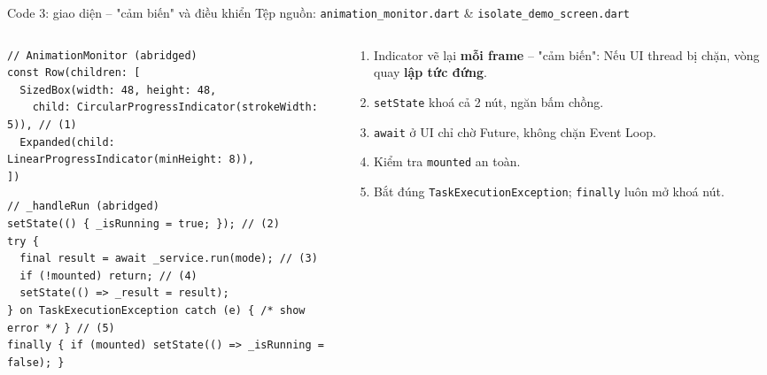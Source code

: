 \documentclass[aspectratio=169,11pt]{beamer}
\newcommand{\cnum}[1]{\textcolor{purpD}{\textbf{(#1)}}}
\begin{document}
\begin{frame}[fragile]{Code 3: giao diện -- "cảm biến" và điều khiển}
  \vspace{-0.25cm}
  {\scriptsize\color{grayD} Tệp nguồn: \texttt{animation\_monitor.dart} \& \texttt{isolate\_demo\_screen.dart}}
  \vspace{0.05cm}
  \begin{columns}[T]
    \begin{column}{0.58\textwidth}
\begin{lstlisting}[basicstyle=\ttfamily\fontsize{6pt}{7pt}\selectfont]
// AnimationMonitor (abridged)
const Row(children: [
  SizedBox(width: 48, height: 48,
    child: CircularProgressIndicator(strokeWidth: 5)), // (1)
  Expanded(child: LinearProgressIndicator(minHeight: 8)),
])
\end{lstlisting}
\begin{lstlisting}[basicstyle=\ttfamily\fontsize{6pt}{7pt}\selectfont]
// _handleRun (abridged)
setState(() { _isRunning = true; }); // (2)
try {
  final result = await _service.run(mode); // (3)
  if (!mounted) return; // (4)
  setState(() => _result = result);
} on TaskExecutionException catch (e) { /* show error */ } // (5)
finally { if (mounted) setState(() => _isRunning = false); }
\end{lstlisting}
    \end{column}
    \begin{column}{0.42\textwidth}
      \scriptsize
      \begin{enumerate}
        \setlength{\itemsep}{0.08cm}
        \item[\cnum{1}] Indicator vẽ lại \textbf{mỗi frame} -- "cảm biến": Nếu UI thread bị chặn, vòng quay \textbf{lập tức đứng}.
        \item[\cnum{2}] \texttt{setState} khoá cả 2 nút, ngăn bấm chồng.
        \item[\cnum{3}] \texttt{await} ở UI chỉ chờ Future, không chặn Event Loop.
        \item[\cnum{4}] Kiểm tra \texttt{mounted} an toàn.
        \item[\cnum{5}] Bắt đúng \texttt{TaskExecutionException}; \texttt{finally} luôn mở khoá nút.
      \end{enumerate}
    \end{column}
  \end{columns}
\end{frame}
\end{document}
